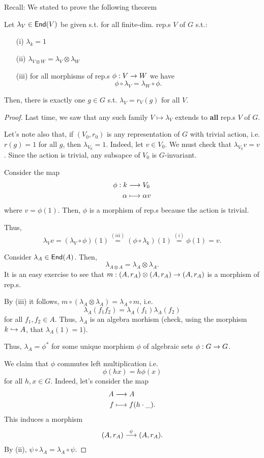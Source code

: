 Recall: We stated to prove the following theorem
\begin{theorem}
	Let $\lambda_V \in  \textsf{End}(V)$ be given s.t. for all finite-dim. rep.s $V$ of $G$ s.t.:
	\begin{itemize}
		\item[(i)] $\lambda_k = 1$
		\item[(ii)] $\lambda_{V\otimes W} = \lambda_V \otimes \lambda_W$
		\item[(iii)] for all morphisms of rep.s $\phi :V \overset{}{\rightarrow} W$ we have
		\[ \phi \circ \lambda_V = \lambda_W \circ \phi. \]
	\end{itemize}
Then, there is exactly one $g \in G$ s.t. $\lambda_V = r_V(g)$ for all $V$.
\end{theorem}
\begin{proof}
	Last time, we saw that any such family $V \mapsto \lambda_V$ extends to \textbf{all} rep.s $V$ of $G$.
	
	Let's note also that, if $(V_0, r_0)$ is any representation of $G$ with trivial action, i.e. $r(g) = 1$ for all $g$, then $\lambda_{V_0} = 1$.
	Indeed, let $v\in V_0$. We must check that $\lambda_{V_0} v = v$. Since the action is trivial, any subsapce of $V_0$ is $G$-invariant.
	
	Consider the map
	\begin{align*}
	\phi : k& \overset{}{\longrightarrow} V_0\\
	\alpha & \longmapsto \alpha v
	\end{align*}
	where $v = \phi(1)$. Then, $\phi$ is a morphism of rep.s because the action is trivial.
	
	Thus,
	\[ \lambda_Vv = (\lambda_V \circ \phi)(1) \overset{(iii)}{=} (\phi \circ \lambda_k) (1) \overset{(i)}{=} \phi(1) = v. \]
	
	Consider $\lambda_A \in \textsf{End}(A)$. Then,
	\[ \lambda_{A\otimes A} = \lambda_A \otimes \lambda_A. \]
	It is an easy exercise to see that $m : (A, r_A) \otimes (A,r_A) \overset{}{\rightarrow} (A,r_A)$ is a morphism of rep.s.
	
	By (iii) it follows, $m \circ (\lambda_A\otimes \lambda_A) = \lambda_A \circ m$, i.e.
	\[ \lambda_A(f_1f_2) = \lambda_A(f_1) \lambda_A(f_2) \]
	for all $f_1, f_2 \in A$. Thus, $\lambda_A$ is an algebra morhism (check, using the morphism $k \overset{}{\hookrightarrow} A$, that $\lambda_A(1) = 1$).
	
	Thus, $\lambda_A = \phi^*$ for some unique morphism $\phi$ of algebraic sets $\phi : G \overset{}{\rightarrow} G$.
	
	We claim that $\phi$ commutes left multiplication i.e.
	\[ \phi(hx) = h \phi(x) \]
	for all $h,x \in G$. Indeed, let's consider the map
	\begin{align*}
	A & \overset{}{\longrightarrow} A\\
	f &\longmapsto f(h\cdot\_).
	\end{align*}
	This induces a morphism
	\begin{align*}
	(A, r_A) \overset{\psi}{\longrightarrow} (A,r_A).
	\end{align*}
	By (ii), $\psi \circ \lambda_A = \lambda_A \circ \psi$.
	

\end{proof}
